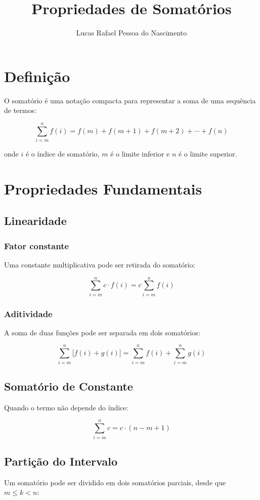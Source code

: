 \documentclass[12pt, a4paper]{article}
\title{\textbf{Propriedades de Somatórios}}
\author{Lucas Rafael Pessoa do Nascimento}
\date{}
\begin{document}
\maketitle

\section{Definição}

O somatório é uma notação compacta para representar a soma de uma sequência de termos:

\[
\sum_{i=m}^{n} f(i) = f(m) + f(m+1) + f(m+2) + \cdots + f(n)
\]

onde $i$ é o índice de somatório, $m$ é o limite inferior e $n$ é o limite superior.

\section{Propriedades Fundamentais}

\subsection{Linearidade}

\subsubsection*{Fator constante}
Uma constante multiplicativa pode ser retirada do somatório:

\[
\sum_{i=m}^{n} c \cdot f(i) = c \sum_{i=m}^{n} f(i)
\]

\subsubsection*{Aditividade}
A soma de duas funções pode ser separada em dois somatórios:

\[
\sum_{i=m}^{n} \bigl[f(i) + g(i)\bigr] = \sum_{i=m}^{n} f(i) + \sum_{i=m}^{n} g(i)
\]

\subsection{Somatório de Constante}
Quando o termo não depende do índice:

\[
\sum_{i=m}^{n} c = c \cdot (n - m + 1)
\]

\subsection{Partição do Intervalo}
Um somatório pode ser dividido em dois somatórios parciais, desde que $m \leq k < n$:
\end{document}
